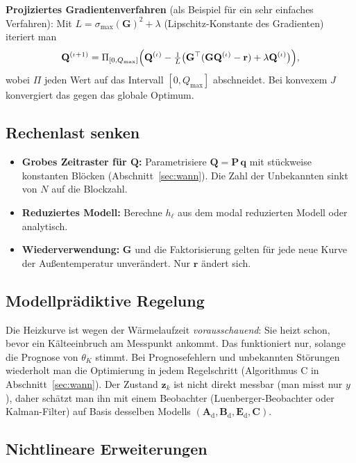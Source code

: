 \documentclass[11pt,a4paper]{article}
\numberwithin{equation}{section}
\newcommand{\thK}{\theta_{K}}
\newcommand{\mC}{\mathbf{C}}
\newcommand{\mG}{\mathbf{G}}
\newcommand{\mAd}{\mathbf{A}_{\mathrm d}}
\newcommand{\mBd}{\mathbf{B}_{\mathrm d}}
\newcommand{\mEd}{\mathbf{E}_{\mathrm d}}
\newcommand{\vz}{\mathbf{z}}
\newcommand{\vQ}{\mathbf{Q}}
\newcommand{\vr}{\mathbf{r}}
\begin{document}
\textbf{Projiziertes Gradientenverfahren} (als Beispiel für ein sehr einfaches Verfahren): Mit $L=\sigma_{\max}(\mG)^2+\lambda$ (Lipschitz-Konstante des Gradienten) iteriert man
\begin{equation}
 \vQ^{(\iota+1)}=\Pi_{[0,Q_{\max}]}\Bigl(\vQ^{(\iota)}-\tfrac{1}{L}\bigl(\mG^\top(\mG\vQ^{(\iota)}-\vr)+\lambda\vQ^{(\iota)}\bigr)\Bigr),
\end{equation}
wobei $\Pi$ jeden Wert auf das Intervall $[0,Q_{\max}]$ abschneidet. Bei konvexem $J$ konvergiert das gegen das globale Optimum.

\subsection{Rechenlast senken}

\begin{itemize}
 \item \textbf{Grobes Zeitraster für $\vQ$:} Parametrisiere $\vQ=\mathbf P\,\mathbf q$ mit stückweise konstanten Blöcken (Abschnitt~\ref{sec:wann}). Die Zahl der Unbekannten sinkt von $N$ auf die Blockzahl.
 \item \textbf{Reduziertes Modell:} Berechne $h_\ell$ aus dem modal reduzierten Modell oder analytisch.
 \item \textbf{Wiederverwendung:} $\mG$ und die Faktorisierung gelten für jede neue Kurve der Außentemperatur unverändert. Nur $\vr$ ändert sich.
\end{itemize}

\subsection{Modellprädiktive Regelung}

Die Heizkurve ist wegen der Wärmelaufzeit \emph{vorausschauend}: Sie heizt schon, bevor ein Kälteeinbruch am Messpunkt ankommt. Das funktioniert nur, solange die Prognose von $\thK$ stimmt. Bei Prognosefehlern und unbekannten Störungen wiederholt man die Optimierung in jedem Regelschritt (Algorithmus C in Abschnitt~\ref{sec:wann}). Der Zustand $\vz_k$ ist nicht direkt messbar (man misst nur $y$), daher schätzt man ihn mit einem Beobachter (Luenberger-Beobachter oder Kalman-Filter) auf Basis desselben Modells $(\mAd,\mBd,\mEd,\mC)$.

\subsection{Nichtlineare Erweiterungen}
\end{document}
